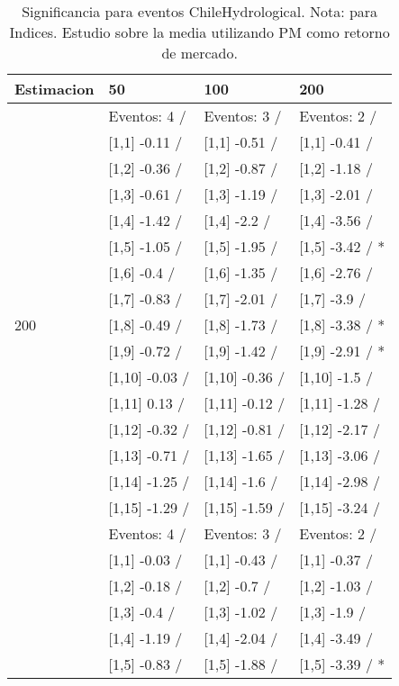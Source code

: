 \begin{table}

\caption{Significancia para eventos ChileHydrological. Nota: para Indices. Estudio sobre la media utilizando PM como retorno de mercado.}
\centering
\begin{tabular}[t]{llll}
\toprule
Estimacion & 50 & 100 & 200\\
\midrule
 & Eventos:  4 / & Eventos:  3 / & Eventos:  2 /\\
 & {}[1,1] -0.11  / & {}[1,1] -0.51  / & {}[1,1] -0.41  /\\
 & {}[1,2] -0.36  / & {}[1,2] -0.87  / & {}[1,2] -1.18  /\\
 & {}[1,3] -0.61  / & {}[1,3] -1.19  / & {}[1,3] -2.01  /\\
 & {}[1,4] -1.42  / & {}[1,4] -2.2  / & {}[1,4] -3.56  /\\
\addlinespace
 & {}[1,5] -1.05  / & {}[1,5] -1.95  / & {}[1,5] -3.42  / *\\
 & {}[1,6] -0.4  / & {}[1,6] -1.35  / & {}[1,6] -2.76  /\\
 & {}[1,7] -0.83  / & {}[1,7] -2.01  / & {}[1,7] -3.9  /\\
200 & {}[1,8] -0.49  / & {}[1,8] -1.73  / & {}[1,8] -3.38  / *\\
 & {}[1,9] -0.72  / & {}[1,9] -1.42  / & {}[1,9] -2.91  / *\\
\addlinespace
 & {}[1,10] -0.03  / & {}[1,10] -0.36  / & {}[1,10] -1.5  /\\
 & {}[1,11] 0.13  / & {}[1,11] -0.12  / & {}[1,11] -1.28  /\\
 & {}[1,12] -0.32  / & {}[1,12] -0.81  / & {}[1,12] -2.17  /\\
 & {}[1,13] -0.71  / & {}[1,13] -1.65  / & {}[1,13] -3.06  /\\
 & {}[1,14] -1.25  / & {}[1,14] -1.6  / & {}[1,14] -2.98  /\\
\addlinespace
 & {}[1,15] -1.29  / & {}[1,15] -1.59  / & {}[1,15] -3.24  /\\
 & Eventos:  4 / & Eventos:  3 / & Eventos:  2 /\\
 & {}[1,1] -0.03  / & {}[1,1] -0.43  / & {}[1,1] -0.37  /\\
 & {}[1,2] -0.18  / & {}[1,2] -0.7  / & {}[1,2] -1.03  /\\
 & {}[1,3] -0.4  / & {}[1,3] -1.02  / & {}[1,3] -1.9  /\\
\addlinespace
 & {}[1,4] -1.19  / & {}[1,4] -2.04  / & {}[1,4] -3.49  /\\
 & {}[1,5] -0.83  / & {}[1,5] -1.88  / & {}[1,5] -3.39  / *\\

\end{tabular}
\end{table}
